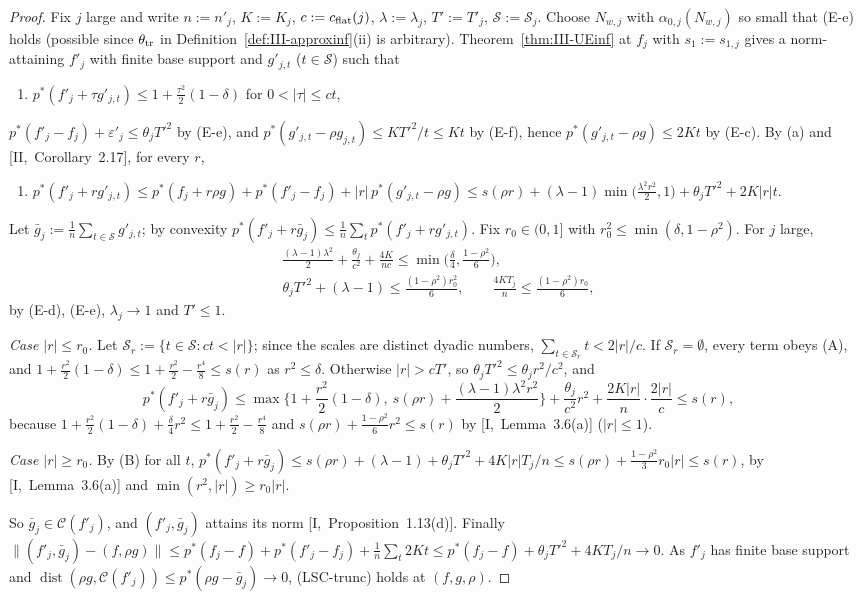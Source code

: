 \documentclass[10pt]{amsart}
\theoremstyle{definition}
\theoremstyle{remark}
\newcommand{\dist}{\operatorname{dist}}
\newcommand{\Cset}{\mathcal C}
\begin{document}
\begin{proof}
Fix $j$ large and write $n:=n'_j$, $K:=K_j$, $c:=c_{\rm flat}(j)$,
$\lambda:=\lambda_j$, $T':=T'_j$, $\mathcal S:=\mathcal S_j$.  Choose $N_{w,j}$
with $\alpha_{0,j}(N_{w,j})$ so small that (E-e) holds (possible since
$\theta_{\rm tr}$ in Definition~\ref{def:III-approxinf}(ii) is arbitrary).
Theorem~\ref{thm:III-UEinf} at $f_j$ with $s_1:=s_{1,j}$ gives a norm-attaining
$f'_j$ with finite base support and $g'_{j,t}$ ($t\in\mathcal S$) such that
\begin{enumerate}
\item[(A)] $p^*(f'_j+\tau g'_{j,t})\le1+\frac{\tau^2}2(1-\delta)$ for
$0<|\tau|\le ct$,
\end{enumerate}
$p^*(f'_j-f_j)+\varepsilon'_j\le\theta_jT'^2$ by (E-e), and
$p^*(g'_{j,t}-\rho g_{j,t})\le KT'^2/t\le Kt$ by (E-f), hence
$p^*(g'_{j,t}-\rho g)\le2Kt$ by (E-c).  By (a) and
[II,~Corollary~2.17], for every $r$,
\begin{enumerate}
\item[(B)] $p^*(f'_j+rg'_{j,t})\le p^*(f_j+r\rho g)+p^*(f'_j-f_j)+|r|\,
p^*(g'_{j,t}-\rho g)\le s(\rho r)+(\lambda-1)\min\big(\frac{\lambda^2r^2}2,1
\big)+\theta_jT'^2+2K|r|t$.
\end{enumerate}
Let $\bar g_j:=\frac1n\sum_{t\in\mathcal S}g'_{j,t}$; by convexity
$p^*(f'_j+r\bar g_j)\le\frac1n\sum_tp^*(f'_j+rg'_{j,t})$.  Fix $r_0\in(0,1]$
with $r_0^2\le\min(\delta,1-\rho^2)$.  For $j$ large,
\begin{gather*}
 \frac{(\lambda-1)\lambda^2}2+\frac{\theta_j}{c^2}+\frac{4K}{nc}\le
 \min\Big(\frac\delta4,\frac{1-\rho^2}6\Big),\\
 \theta_jT'^2+(\lambda-1)\le\frac{(1-\rho^2)r_0^2}{6},\qquad
 \frac{4KT_j}n\le\frac{(1-\rho^2)r_0}6,
\end{gather*}
by (E-d), (E-e), $\lambda_j\to1$ and $T'\le1$.

\emph{Case $|r|\le r_0$.}  Let $\mathcal S_r:=\{t\in\mathcal S:ct<|r|\}$;
since the scales are distinct dyadic numbers, $\sum_{t\in\mathcal S_r}t<
2|r|/c$.  If $\mathcal S_r=\emptyset$, every term obeys (A), and
$1+\frac{r^2}2(1-\delta)\le1+\frac{r^2}2-\frac{r^4}8\le s(r)$ as
$r^2\le\delta$.  Otherwise $|r|>cT'$, so $\theta_jT'^2\le\theta_jr^2/c^2$, and
\[
 p^*(f'_j+r\bar g_j)\le\max\Big\{1+\frac{r^2}2(1-\delta),\ s(\rho r)+
 \frac{(\lambda-1)\lambda^2r^2}2\Big\}+\frac{\theta_j}{c^2}r^2+
 \frac{2K|r|}n\cdot\frac{2|r|}c\le s(r),
\]
because $1+\frac{r^2}2(1-\delta)+\frac\delta4r^2\le1+\frac{r^2}2-\frac{r^4}8$
and $s(\rho r)+\frac{1-\rho^2}6r^2\le s(r)$ by [I,~Lemma~3.6(a)] ($|r|\le1$).

\emph{Case $|r|\ge r_0$.}  By (B) for all $t$, $p^*(f'_j+r\bar g_j)\le s(\rho r)+
(\lambda-1)+\theta_jT'^2+4K|r|T_j/n\le s(\rho r)+\frac{1-\rho^2}3r_0|r|\le
s(r)$, by [I,~Lemma~3.6(a)] and $\min(r^2,|r|)\ge r_0|r|$.

So $\bar g_j\in\Cset(f'_j)$, and $(f'_j,\bar g_j)$ attains its norm
[I,~Proposition~1.13(d)].  Finally $\|(f'_j,\bar g_j)-(f,\rho g)\|\le
p^*(f_j-f)+p^*(f'_j-f_j)+\frac1n\sum_t2Kt\le p^*(f_j-f)+\theta_jT'^2+
4KT_j/n\to0$.  As $f'_j$ has finite base support and
$\dist(\rho g,\Cset(f'_j))\le p^*(\rho g-\bar g_j)\to0$, (LSC-trunc) holds at
$(f,g,\rho)$.
\end{proof}
\end{document}
